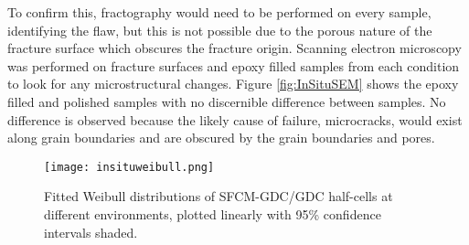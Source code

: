         To confirm this, fractography would need to be performed on every sample, identifying the flaw, but this is not possible due to the porous nature of the fracture surface which obscures the fracture origin.
        Scanning electron microscopy was performed on fracture surfaces and epoxy filled  samples from each condition to look for any microstructural changes.
        Figure \ref{fig:InSituSEM} shows the epoxy filled and polished samples with no discernible difference between samples.
        No difference is observed because the likely cause of failure, microcracks, would exist along grain boundaries and are obscured by the grain boundaries and pores.\cite{Danzer2008,Yu2007}

        \begin{figure}
          \texttt{[image: insituweibull.png]}
          \caption{Fitted Weibull distributions of SFCM-GDC/GDC half-cells at different environments, plotted linearly with 95\% confidence intervals shaded.}
          \label{fig:halfcellweibull}
        \end{figure}

